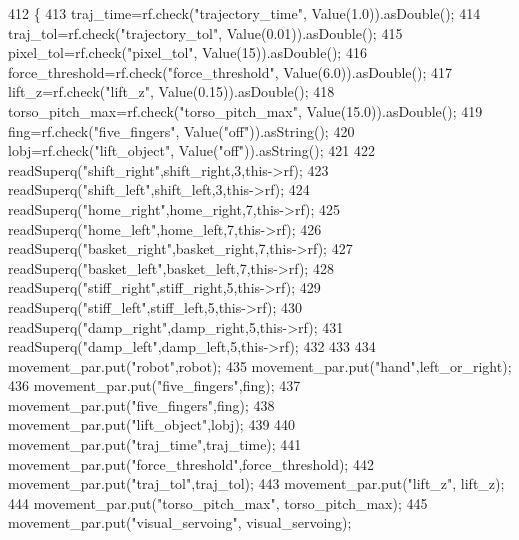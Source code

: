 \begin{DoxyCode}
412 \{
413     traj\_time=rf.check(\textcolor{stringliteral}{"trajectory\_time"}, Value(1.0)).asDouble();
414     traj\_tol=rf.check(\textcolor{stringliteral}{"trajectory\_tol"}, Value(0.01)).asDouble();
415     pixel\_tol=rf.check(\textcolor{stringliteral}{"pixel\_tol"}, Value(15)).asDouble();
416     force\_threshold=rf.check(\textcolor{stringliteral}{"force\_threshold"}, Value(6.0)).asDouble();
417     lift\_z=rf.check(\textcolor{stringliteral}{"lift\_z"}, Value(0.15)).asDouble();
418     torso\_pitch\_max=rf.check(\textcolor{stringliteral}{"torso\_pitch\_max"}, Value(15.0)).asDouble();
419     fing=rf.check(\textcolor{stringliteral}{"five\_fingers"}, Value(\textcolor{stringliteral}{"off"})).asString();
420     lobj=rf.check(\textcolor{stringliteral}{"lift\_object"}, Value(\textcolor{stringliteral}{"off"})).asString();
421 
422     readSuperq(\textcolor{stringliteral}{"shift\_right"},shift\_right,3,this->rf);
423     readSuperq(\textcolor{stringliteral}{"shift\_left"},shift\_left,3,this->rf);
424     readSuperq(\textcolor{stringliteral}{"home\_right"},home\_right,7,this->rf);
425     readSuperq(\textcolor{stringliteral}{"home\_left"},home\_left,7,this->rf);
426     readSuperq(\textcolor{stringliteral}{"basket\_right"},basket\_right,7,this->rf);
427     readSuperq(\textcolor{stringliteral}{"basket\_left"},basket\_left,7,this->rf);
428     readSuperq(\textcolor{stringliteral}{"stiff\_right"},stiff\_right,5,this->rf);
429     readSuperq(\textcolor{stringliteral}{"stiff\_left"},stiff\_left,5,this->rf);
430     readSuperq(\textcolor{stringliteral}{"damp\_right"},damp\_right,5,this->rf);
431     readSuperq(\textcolor{stringliteral}{"damp\_left"},damp\_left,5,this->rf);
432 
433 
434     movement\_par.put(\textcolor{stringliteral}{"robot"},robot);
435     movement\_par.put(\textcolor{stringliteral}{"hand"},left\_or\_right);
436     movement\_par.put(\textcolor{stringliteral}{"five\_fingers"},fing);
437     movement\_par.put(\textcolor{stringliteral}{"five\_fingers"},fing);
438     movement\_par.put(\textcolor{stringliteral}{"lift\_object"},lobj);
439 
440     movement\_par.put(\textcolor{stringliteral}{"traj\_time"},traj\_time);
441     movement\_par.put(\textcolor{stringliteral}{"force\_threshold"},force\_threshold);
442     movement\_par.put(\textcolor{stringliteral}{"traj\_tol"},traj\_tol);
443     movement\_par.put(\textcolor{stringliteral}{"lift\_z"}, lift\_z);
444     movement\_par.put(\textcolor{stringliteral}{"torso\_pitch\_max"}, torso\_pitch\_max);
445     movement\_par.put(\textcolor{stringliteral}{"visual\_servoing"}, visual\_servoing);

\end{DoxyCode}
